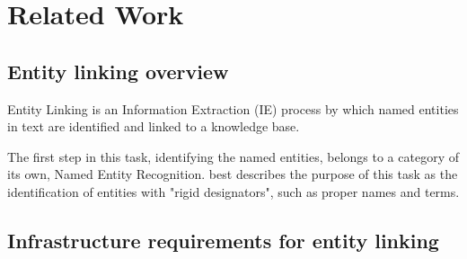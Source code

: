 \section{Related Work} %
\subsection{Entity linking overview} %

Entity Linking is an Information Extraction (IE) process by which named entities in text are identified and linked to a knowledge base.

The first step in this task, identifying the named entities, belongs to a category of its own, Named Entity Recognition.
\cite{rw_elo_Nadeau2009} best describes the purpose of this task as the identification of entities with "rigid designators",
such as proper names and terms. 






\subsection{Infrastructure requirements for entity linking}
